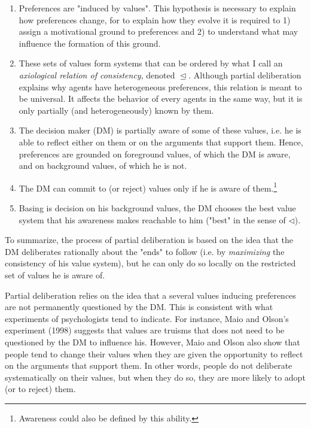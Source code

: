 \documentclass[11pt]{article}
\begin{document}
 \begin{enumerate}

\item Preferences are "induced by values". This hypothesis is necessary to explain how preferences change, for to explain how they evolve it is required to 1) assign a motivational ground to preferences and 2) to understand what may influence the formation of this ground. 
\item These sets of values form systems that can be ordered by what I call an \textit{axiological relation of consistency}, denoted $\trianglelefteq$. Although partial deliberation explains why agents have heterogeneous preferences, this relation is meant to be universal. It affects the behavior of every agents in the same way, but it is only partially (and heterogeneously) known by them. 
\item The decision maker (DM) is partially aware of some of these values, i.e. he is able to reflect either on them or on the arguments that support them. Hence, preferences are grounded on foreground values, of which the DM is aware, and on background values, of which he is not.   
\item The DM can commit to (or reject) values only if he is aware of them.\footnote{Awareness could also be defined by this ability.} 
\item Basing is decision on his background values, the DM chooses the best value system that his awareness makes reachable to him ("best" in the sense of $\triangleleft$). 
 \end{enumerate}
To summarize, the process of partial deliberation is based on the idea that the DM deliberates rationally about the "ends" to follow (i.e. by \textit{maximizing} the consistency of his value system), but he can only do so locally on the restricted set of values he is aware of.  
 
Partial deliberation relies on the idea that a several values inducing preferences are not permanently questioned by the DM. This is consistent with what experiments of psychologists tend to indicate. For instance, Maio and Olson's experiment (1998) suggests that values are truisms that does not need to be questioned by the DM to influence his. However, Maio and Olson also show that people tend to change their values when they are given the opportunity to reflect on the arguments that support them. In other words, people do not deliberate systematically on their values, but when they do so, they are more likely to adopt (or to reject) them. 
\end{document}
